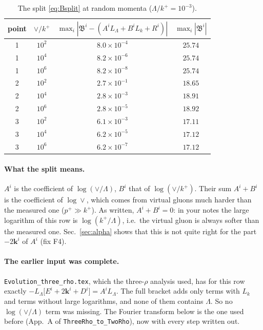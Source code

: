 \documentclass[10pt]{article}
\numberwithin{equation}{section}
\newcommand{\bk}{\mathbf k}
\begin{document}
\begin{table}[H]
\centering\small
\begin{tabular}{@{}c c c c@{}}
point & $\vee/k^+$ & $\max_i|\mathfrak B^i-(A^iL_\Lambda+B^iL_k+R^i)|$ & $\max_i|\mathfrak B^i|$\\ \hline
1 & $10^{2}$ & $8.0\times10^{-4}$ & $25.74$\\
1 & $10^{4}$ & $8.2\times10^{-6}$ & $25.74$\\
1 & $10^{6}$ & $8.2\times10^{-8}$ & $25.74$\\
2 & $10^{2}$ & $2.7\times10^{-1}$ & $18.65$\\
2 & $10^{4}$ & $2.8\times10^{-3}$ & $18.91$\\
2 & $10^{6}$ & $2.8\times10^{-5}$ & $18.92$\\
3 & $10^{2}$ & $6.1\times10^{-3}$ & $17.11$\\
3 & $10^{4}$ & $6.2\times10^{-5}$ & $17.12$\\
3 & $10^{6}$ & $6.2\times10^{-7}$ & $17.12$\\
\end{tabular}
\caption{The split \eqref{eq:Bsplit} at random momenta ($\Lambda/k^+=10^{-3}$).}
\label{tab:largev}
\end{table}

\paragraph{What the split means.} $A^i$ is the coefficient of $\log(\vee/\Lambda)$, $B^i$ that of $\log(\vee/k^+)$. Their sum $A^i+B^i$ is the coefficient of $\log\vee$, which comes from virtual gluons much harder than the measured one ($p^+\gg k^+$). As written, $A^i+B^i=0$: in your notes the large logarithm of this row is $\log(k^+/\Lambda)$, i.e.\ the virtual gluon is always softer than the measured one. Sec.~\ref{sec:alpha} shows that this is not quite right for the part $-2\bk^i$ of $A^i$ (fix F4).

\paragraph{The earlier input was complete.} \texttt{Evolution\_three\_rho.tex}, which the three-$\rho$ analysis used, has for this row exactly $-L_\Lambda\big[E^i+2\bk^i+D^i\big]=A^iL_\Lambda$. The full bracket adds only terms with $L_k$ and terms without large logarithms, and none of them contains $\Lambda$. So no $\log(\vee/\Lambda)$ term was missing. The Fourier transform below is the one used before (App.~A of \texttt{ThreeRho\_to\_TwoRho}), now with every step written out.
\end{document}
